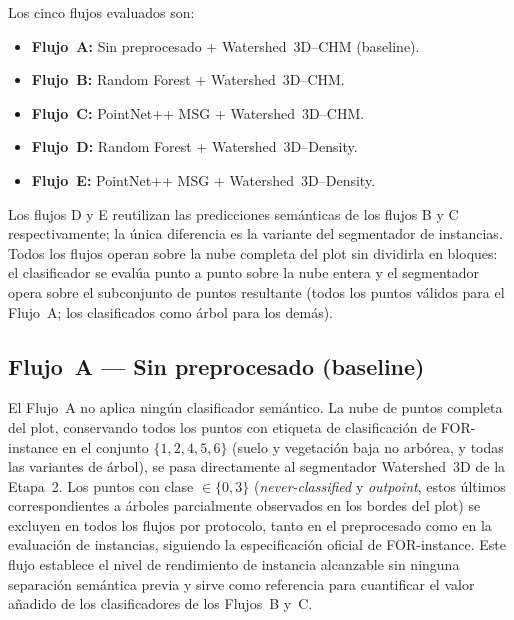 \documentclass[runningheads]{llncs}
\begin{document}
Los cinco flujos evaluados son:
\begin{itemize}
  \item \textbf{Flujo~A:} Sin preprocesado + Watershed~3D--CHM (baseline).
  \item \textbf{Flujo~B:} Random Forest + Watershed~3D--CHM.
  \item \textbf{Flujo~C:} PointNet++ MSG + Watershed~3D--CHM.
  \item \textbf{Flujo~D:} Random Forest + Watershed~3D--Density.
  \item \textbf{Flujo~E:} PointNet++ MSG + Watershed~3D--Density.
\end{itemize}

Los flujos D y E reutilizan las predicciones sem\'anticas de los flujos B y C respectivamente; la \'unica diferencia es la variante del segmentador de instancias. Todos los flujos operan sobre la nube completa del plot sin dividirla en bloques: el clasificador se eval\'ua punto a punto sobre la nube entera y el segmentador opera sobre el subconjunto de puntos resultante (todos los puntos v\'alidos para el Flujo~A; los clasificados como \'arbol para los dem\'as).

\subsection{Flujo~A --- Sin preprocesado (baseline)}

El Flujo~A no aplica ning\'un clasificador sem\'antico. La nube de puntos completa del plot, conservando todos los puntos con etiqueta de clasificaci\'on de FOR-instance en el conjunto $\{1, 2, 4, 5, 6\}$ (suelo y vegetaci\'on baja no arb\'orea, y todas las variantes de \'arbol), se pasa directamente al segmentador Watershed~3D de la Etapa~2. Los puntos con clase $\in \{0, 3\}$ (\emph{never-classified} y \emph{outpoint}, estos \'ultimos correspondientes a \'arboles parcialmente observados en los bordes del plot) se excluyen en todos los flujos por protocolo, tanto en el preprocesado como en la evaluaci\'on de instancias, siguiendo la especificaci\'on oficial de FOR-instance. Este flujo establece el nivel de rendimiento de instancia alcanzable sin ninguna separaci\'on sem\'antica previa y sirve como referencia para cuantificar el valor a\~nadido de los clasificadores de los Flujos~B y~C.
\end{document}
